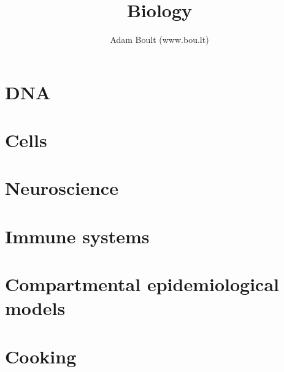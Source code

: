 \documentclass[oneside]{book}
\begin{document}
\author{Adam Boult (www.bou.lt)}
\title{Biology}
\maketitle

\setcounter{tocdepth}{0}
\tableofcontents



\part{DNA}



\part{Cells}





\part{Neuroscience}


\part{Immune systems}







\part{Compartmental epidemiological models}






\part{Cooking}







\end{document}
